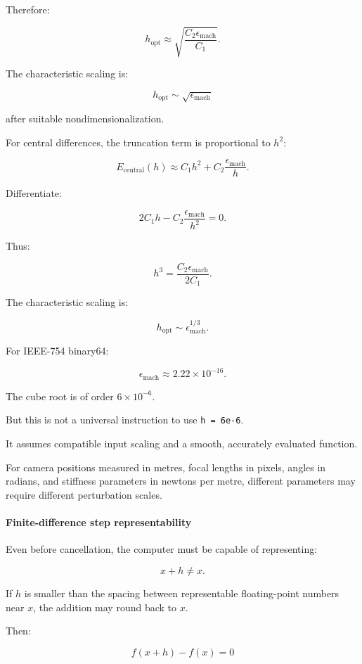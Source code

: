 Therefore:

\[
\boxed{ h_{\mathrm{opt}} \approx \sqrt{\frac{C_2\epsilon_{\mathrm{mach}}}{C_1}} }.
\]

The characteristic scaling is:

\[
h_{\mathrm{opt}}\sim\sqrt{\epsilon_{\mathrm{mach}}}
\]

after suitable nondimensionalization.

For central differences, the truncation term is proportional to \(h^2\):

\[
E_{\mathrm{central}}(h) \approx C_1h^2+ C_2\frac{\epsilon_{\mathrm{mach}}}{h}.
\]

Differentiate:

\[
2C_1h- C_2\frac{\epsilon_{\mathrm{mach}}}{h^2}=0.
\]

Thus:

\[
h^3= \frac{C_2\epsilon_{\mathrm{mach}}}{2C_1}.
\]

The characteristic scaling is:

\[
\boxed{ h_{\mathrm{opt}}\sim \epsilon_{\mathrm{mach}}^{1/3} }.
\]

For IEEE-754 binary64:

\[
\epsilon_{\mathrm{mach}} \approx2.22\times10^{-16}.
\]

The cube root is of order \(6\times10^{-6}\).

But this is not a universal instruction to use \texttt{h\ =\ 6e-6}.

It assumes compatible input scaling and a smooth, accurately evaluated function.

For camera positions measured in metres, focal lengths in pixels, angles in radians, and stiffness parameters in newtons per metre, different parameters may require different perturbation scales.

\paragraph{Finite-difference step representability}\label{02-foundations-ii-ch025-finite-difference-step-representability}

Even before cancellation, the computer must be capable of representing:

\[
x+h\ne x.
\]

If \(h\) is smaller than the spacing between representable floating-point numbers near \(x\), the addition may round back to \(x\).

Then:

\[
f(x+h)-f(x)=0
\]

